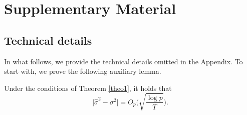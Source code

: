 \documentclass[a4paper,12pt]{article}
\numberwithin{equation}{section}
\begin{document}
\newpage
\def\thesection{\Alph{section}}
\setcounter{section}{18}
\section{Supplementary Material}


\def\theequation{S.\arabic{equation}}
\setcounter{equation}{0}
\def\thefigure{S.\arabic{figure}}
\setcounter{figure}{0}
\def\thetable{S.\arabic{table}}
\setcounter{table}{0}
\renewcommand{\baselinestretch}{1.2}\normalsize



\subsection{Technical details}


In what follows, we provide the technical details omitted in the Appendix. To start with, we prove the following auxiliary lemma.
\begin{lemmaS}\label{lemmaS1}
Under the conditions of Theorem \ref{theo1}, it holds that 
\[ \big| \hat{\sigma}^2 - \sigma^2 \big| = O_p\Big( \sqrt{\frac{\log p}{T}} \Big). \]
\end{lemmaS} 
\end{document}
